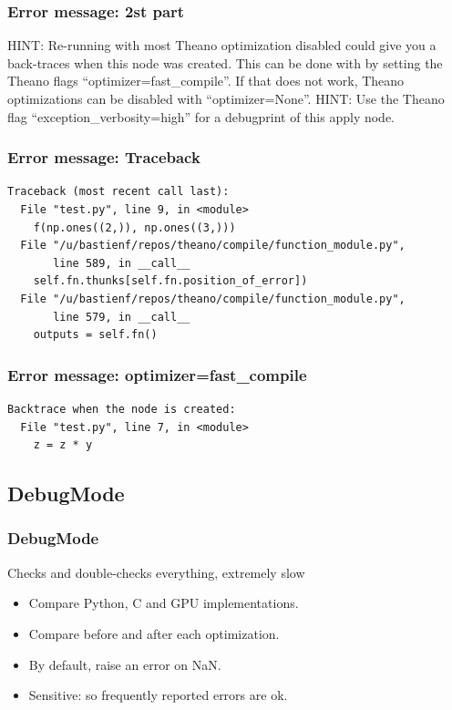 \documentclass[utf8x,xcolor=pdftex,dvipsnames,table]{beamer}
\begin{document}
\begin{frame}[fragile]
  \frametitle{Error message: 2st part}
HINT: Re-running with most Theano optimization
disabled could give you a back-traces when this
node was created. This can be done with by setting
the Theano flags ``optimizer=fast\_compile''. If that does not
work, Theano optimizations can be disabled with
``optimizer=None''.\newline
HINT: Use the Theano flag ``exception\_verbosity=high''
for a debugprint of this apply node.
\end{frame}


\begin{frame}[fragile]
  \frametitle{Error message: Traceback}

\begin{lstlisting}
Traceback (most recent call last):
  File "test.py", line 9, in <module>
    f(np.ones((2,)), np.ones((3,)))
  File "/u/bastienf/repos/theano/compile/function_module.py",
       line 589, in __call__
    self.fn.thunks[self.fn.position_of_error])
  File "/u/bastienf/repos/theano/compile/function_module.py",
       line 579, in __call__
    outputs = self.fn()
\end{lstlisting}
\end{frame}


\begin{frame}[fragile]
  \frametitle{Error message: optimizer=fast\_compile}

\begin{lstlisting}
Backtrace when the node is created:
  File "test.py", line 7, in <module>
    z = z * y

\end{lstlisting}
\end{frame}

\subsection{DebugMode}
\begin{frame}[fragile]
  \frametitle{DebugMode}
    Checks and double-checks everything, extremely slow
\begin{itemize}
\item Compare Python, C and GPU implementations.
\item Compare before and after each optimization.
\item By default, raise an error on NaN.
\item Sensitive: so frequently reported errors are ok.
\end{itemize}
\end{frame}
\end{document}

